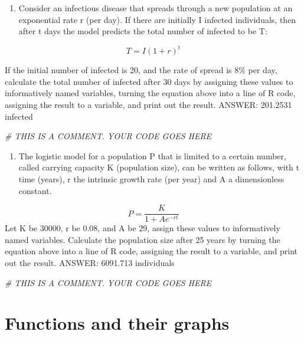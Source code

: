 \documentclass[
]{book}
\newenvironment{Shaded}{\begin{snugshade}}{\end{snugshade}}
\newcommand{\CommentTok}[1]{\textcolor[rgb]{0.56,0.35,0.01}{\textit{#1}}}
\providecommand{\tightlist}{%
  \setlength{\itemsep}{0pt}\setlength{\parskip}{0pt}}
\theoremstyle{definition}
\theoremstyle{definition}
\theoremstyle{definition}
\theoremstyle{remark}
\begin{document}
\begin{enumerate}
\def\labelenumi{\arabic{enumi}.}
\setcounter{enumi}{1}
\tightlist
\item
  Consider an infectious disease that spreads through a new population at an exponential rate r (per day). If there are initially I infected individuals, then after t days the model predicts the total number of infected to be T:
\end{enumerate}

\[ 
T = I(1+r)^t
\]

If the initial number of infected is 20, and the rate of spread is 8\% per day, calculate the total number of infected after 30 days by assigning these values to informatively named variables, turning the equation above into a line of R code, assigning the result to a variable, and print out the result. ANSWER: 201.2531 infected

\begin{Shaded}
\begin{Highlighting}[]
\CommentTok{\# THIS IS A COMMENT. YOUR CODE GOES HERE }
\end{Highlighting}
\end{Shaded}

\begin{enumerate}
\def\labelenumi{\arabic{enumi}.}
\setcounter{enumi}{2}
\tightlist
\item
  The logistic model for a population P that is limited to a certain number, called carrying capacity K (population size), can be written as follows, with t time (years), r the intrinsic growth rate (per year) and A a dimensionless constant.
\end{enumerate}

\[
P= \frac{K}{1 + A e^{-rt}}
\]
Let K be 30000, r be 0.08, and A be 29, assign these values to informatively named variables. Calculate the population size after 25 years by turning the equation above into a line of R code, assigning the result to a variable, and print out the result. ANSWER: 6091.713 individuals

\begin{Shaded}
\begin{Highlighting}[]
\CommentTok{\# THIS IS A COMMENT. YOUR CODE GOES HERE }
\end{Highlighting}
\end{Shaded}

\hypertarget{functions-and-their-graphs}{%
\chapter{Functions and their graphs}\label{functions-and-their-graphs}}
\end{document}
